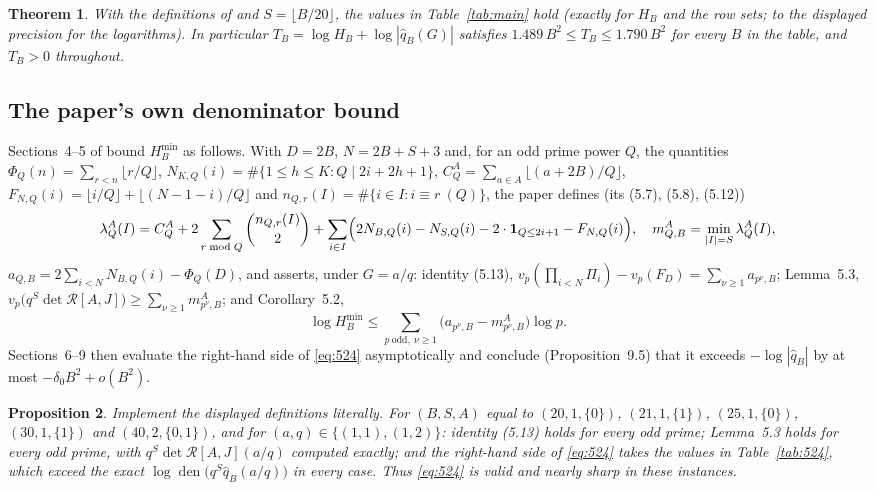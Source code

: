 \documentclass[11pt]{amsart}
\newtheorem{theorem}{Theorem}[section]
\newtheorem{proposition}[theorem]{Proposition}
\theoremstyle{definition}
\newcommand{\qhat}{\widehat{q}}
\DeclareMathOperator{\den}{den}
\begin{document}
\begin{theorem}\label{thm:main}
With the definitions of \cite{Sun26} and $S=\lfloor B/20\rfloor$, the values in Table~\ref{tab:main} hold
(exactly for $H_B$ and the row sets; to the displayed precision for the logarithms). In particular $T_B=\log H_B+\log|\qhat_B(G)|$ satisfies $1.489\,B^2\le T_B\le1.790\,B^2$ for every $B$
in the table, and $T_B>0$ throughout.
\end{theorem}



\subsection{The paper's own denominator bound}
Sections~4--5 of \cite{Sun26} bound $H_B^{\min}$ as follows. With $D=2B$, $N=2B+S+3$ and, for an odd prime
power $Q$, the quantities $\Phi_Q(n)=\sum_{r<n}\lfloor r/Q\rfloor$, $N_{K,Q}(i)=\#\{1\le h\le K: Q\mid 2i+2h+1\}$,
$C^A_Q=\sum_{a\in A}\lfloor(a+2B)/Q\rfloor$, $F_{N,Q}(i)=\lfloor i/Q\rfloor+\lfloor(N-1-i)/Q\rfloor$ and
$n_{Q,r}(I)=\#\{i\in I:i\equiv r\ (Q)\}$, the paper defines (its (5.7), (5.8), (5.12))
\[
\lambda^A_Q(I)=C^A_Q+2\sum_{r\bmod Q}\binom{n_{Q,r}(I)}2+\sum_{i\in I}\Bigl(2N_{B,Q}(i)-N_{S,Q}(i)-2\cdot\mathbf 1_{Q\le2i+1}-F_{N,Q}(i)\Bigr),\quad
m^A_{Q,B}=\min_{|I|=S}\lambda^A_Q(I),
\]
$a_{Q,B}=2\sum_{i<N}N_{B,Q}(i)-\Phi_Q(D)$, and asserts, under $G=a/q$: identity (5.13),
$v_p(\prod_{i<N}\Pi_i)-v_p(F_D)=\sum_{\nu\ge1}a_{p^\nu,B}$; Lemma~5.3, $v_p\bigl(q^S\det\mathcal R[A,J]\bigr)\ge\sum_{\nu\ge1}m^A_{p^\nu,B}$;
and Corollary~5.2,
\begin{equation}\label{eq:524}
\log H_B^{\min}\le\sum_{p\ \mathrm{odd},\ \nu\ge1}\bigl(a_{p^\nu,B}-m^A_{p^\nu,B}\bigr)\log p .
\end{equation}
Sections~6--9 then evaluate the right-hand side of \eqref{eq:524} asymptotically and conclude
(Proposition~9.5) that it exceeds $-\log|\qhat_B|$ by at most $-\delta_0B^2+o(B^2)$.

\begin{proposition}\label{prop:sec5}
Implement the displayed definitions literally. For $(B,S,A)$ equal to $(20,1,\{0\})$, $(21,1,\{1\})$,
$(25,1,\{0\})$, $(30,1,\{1\})$ and $(40,2,\{0,1\})$, and for $(a,q)\in\{(1,1),(1,2)\}$: identity (5.13) holds
for every odd prime; Lemma~5.3 holds for every odd prime, with $q^S\det\mathcal R[A,J](a/q)$ computed exactly;
and the right-hand side of \eqref{eq:524} takes the values in Table~\ref{tab:524}, which exceed the exact
$\log\den\bigl(q^S\qhat_B(a/q)\bigr)$ in every case. Thus \eqref{eq:524} is valid and nearly sharp in these instances.
\end{proposition}
\end{document}

